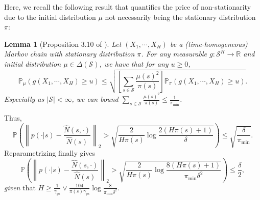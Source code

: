 \documentclass[twoside]{article}
\def\gS{{\mathcal{S}}}
\def\sP{{\mathbb{P}}}
\def\sR{{\mathbb{R}}}
\theoremstyle{plain}
\newtheorem{lemma}{Lemma}[section]
\def\bignorm#1{\left\lVert #1 \right\rVert}
\newcommand{\ps}{\mathrm{ps}}
\begin{document}
Here, we recall the following result that quantifies the price of non-stationarity due to the initial distribution $\mu$ not necessarily being the stationary distribution $\pi$:
\begin{lemma}[Proposition 3.10 of \citet{paulin2015markov}]
	\label{lem:paulin-3.10}
	Let $(X_1, \cdots, X_H)$ be a (time-homogeneous) Markov chain with stationary distribution $\pi$.
	For any measurable $g : \gS^H \rightarrow \sR$ and initial distribution $\mu \in \Delta(\gS)$, we have that for any $u \geq 0$,
	\begin{equation}
		\sP_\mu\left( g(X_1, \cdots, X_H) \geq u\right) \leq \sqrt{ \left[ \sum_{s \in \gS} \frac{\mu(s)^2}{\pi(s)} \right] \sP_\pi\left( g(X_1, \cdots, X_H) \geq u\right)}.
	\end{equation}
	Especially as $|\gS| < \infty$, we can bound $\sum_{s \in \gS} \frac{\mu(s)^2}{\pi(s)} \leq \frac{1}{\pi_{\min}}$.
\end{lemma}
Thus,
\begin{equation*}
	\sP\left( \bignorm{ p(\cdot | s) - \frac{\widehat{N}(s, \cdot)}{\widehat{N}(s)} }_2 > \sqrt{\frac{2}{H \pi(s)} \log\frac{2(H\pi(s) + 1)}{\delta}} \right)
	\leq \sqrt{\frac{\delta}{\pi_{\min}}}.
\end{equation*}
Reparametrizing finally gives
\begin{equation}
	\sP\left( \bignorm{ p(\cdot | s) - \frac{\widehat{N}(s, \cdot)}{\widehat{N}(s)} }_2 > \sqrt{\frac{2}{H \pi(s)} \log\frac{8(H\pi(s) + 1)}{\pi_{\min} \delta^2}} \right)
	\leq \frac{\delta}{2},
\end{equation}
\textit{given} that $H \geq \frac{1}{\gamma_\ps} \vee \frac{104}{\pi(s) \gamma_\ps} \log\frac{8}{\pi_{\min} \delta^2}$.
\end{document}

